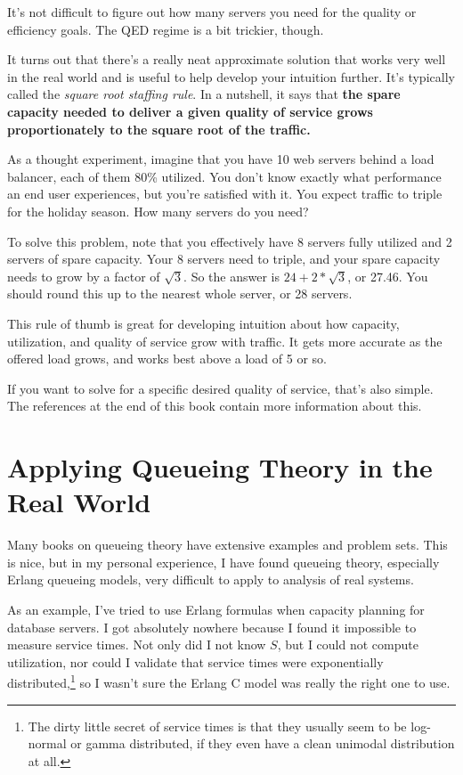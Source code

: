 \documentclass{vivid_layout_pdf}
\begin{document}
It's not difficult to figure out how many servers you need for the quality or
efficiency goals. The QED regime is a bit trickier, though.

It turns out that there's a really neat approximate solution that works very
well in the real world and is useful to help develop your intuition further.
It's typically called the {\itshape square root staffing rule}. In a nutshell,
it says that {\bfseries the spare capacity needed to deliver a given quality of
service grows proportionately to the square root of the traffic.}

As a thought experiment, imagine that you have 10 web servers behind a load
balancer, each of them 80\% utilized. You don't know exactly what performance an
end user experiences, but you're satisfied with it. You expect traffic to triple
for the holiday season. How many servers do you need?

To solve this problem, note that you effectively have 8 servers fully utilized
and 2 servers of spare capacity. Your 8 servers need to triple, and your spare
capacity needs to grow by a factor of \( \sqrt{3} \). So the answer is \( 24 +
2*\sqrt{3} \), or 27.46. You should round this up to the nearest whole server,
or 28 servers.

This rule of thumb is great for developing intuition about how capacity,
utilization, and quality of service grow with traffic. It gets more accurate as
the offered load grows, and works best above a load of 5 or so.

If you want to solve for a specific desired quality of service, that's also
simple. The references at the end of this book contain more information about
this.

\section{Applying Queueing Theory in the Real World}

Many books on queueing theory have extensive examples and problem sets. This is nice, but in my personal experience, I have found queueing theory, especially Erlang queueing models, very difficult to apply to analysis of real systems.

As an example, I've tried to use Erlang formulas when capacity planning for database servers. I got absolutely nowhere because I found it impossible to measure service times. Not only did I not know $S$, but I could not compute utilization, nor could I validate that service times were exponentially distributed,\footnote{The dirty little secret of service times is that they usually seem to be log-normal or gamma distributed, if they even have a clean unimodal distribution at all.} so I wasn't sure the Erlang C model was really the right one to use.
\end{document}
